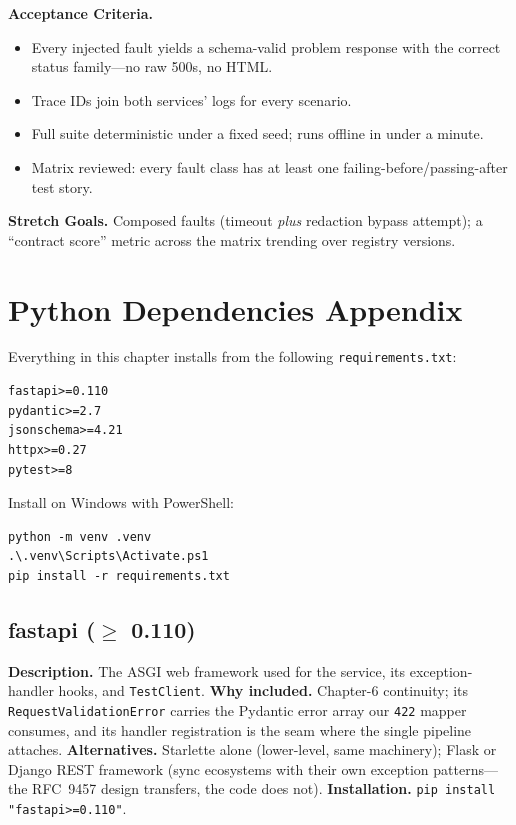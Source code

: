 \textbf{Acceptance Criteria.}
\begin{itemize}
  \item[$\square$] Every injected fault yields a schema-valid problem
        response with the correct status family---no raw 500s, no HTML.
  \item[$\square$] Trace IDs join both services' logs for every scenario.
  \item[$\square$] Full suite deterministic under a fixed seed; runs
        offline in under a minute.
  \item[$\square$] Matrix reviewed: every fault class has at least one
        failing-before/passing-after test story.
\end{itemize}

\textbf{Stretch Goals.} Composed faults (timeout \emph{plus} redaction
bypass attempt); a ``contract score'' metric across the matrix trending
over registry versions.

\section{Python Dependencies Appendix}

Everything in this chapter installs from the following
\texttt{requirements.txt}:

\begin{verbatim}
fastapi>=0.110
pydantic>=2.7
jsonschema>=4.21
httpx>=0.27
pytest>=8
\end{verbatim}

Install on Windows with PowerShell:

\begin{verbatim}
python -m venv .venv
.\.venv\Scripts\Activate.ps1
pip install -r requirements.txt
\end{verbatim}

\subsection{fastapi ($\geq$ 0.110)}

\textbf{Description.} The ASGI web framework used for the service, its
exception-handler hooks, and \texttt{TestClient}. \textbf{Why included.}
Chapter-6 continuity; its \texttt{RequestValidationError} carries the
Pydantic error array our \texttt{422} mapper consumes, and its handler
registration is the seam where the single pipeline attaches.
\textbf{Alternatives.} Starlette alone (lower-level, same machinery); Flask
or Django REST framework (sync ecosystems with their own exception
patterns---the RFC~9457 design transfers, the code does not).
\textbf{Installation.} \texttt{pip install "fastapi>=0.110"}.


